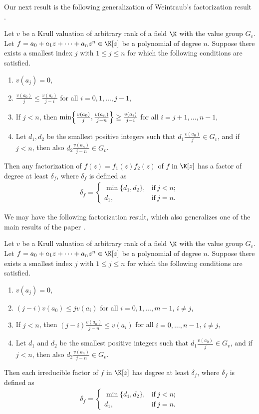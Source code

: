 \documentclass[12pt]{amsart}%
\begin{document}
Our next result is the following generalization of Weintraub's factorization result \cite{W}.
\begin{theorem}\label{th:2}
Let $v$ be a Krull valuation of arbitrary rank of a field $\K$ with  the value group $G_v$. Let $f=a_0+a_1 z+\cdots+a_nz^n \in \K[z]$ be a polynomial of degree $n$. Suppose there exists a smallest index $j$ with $1\leq j\leq n$ for which the following conditions are satisfied.
\begin{enumerate}[label=$(\roman*)$]
\item[$(i)$] $v(a_j)=0$,
\item[$(ii)$] $\frac{v(a_0)}{j}\leq \frac{v(a_i)}{j-i}$ for all $i=0,1,\ldots, j-1$,
\item[(iii)] If $j<n$, then $\min\Bigl\{\frac{v(a_0)}{j}, \frac{v(a_n)}{j-n}\Bigr\} \geq \frac{v(a_i)}{j-i}$ for all $i=j+1, \ldots, n-1$,
\item[$(iv)$] Let $d_1, d_2$ be the smallest positive integers such that $d_1\frac{v(a_0)}{j}\in G_v$, and if $j<n$, then also $d_2\frac{v(a_n)}{j-n}\in G_v$.
\end{enumerate}
Then any factorization of $f(z)=f_1(z)f_2(z)$ of $f$ in $\K[z]$ has a factor of degree at least $\delta_f$, where  $\delta_f$ is defined as
\begin{eqnarray*}
\delta_f=\begin{cases} \min\{d_1,d_2\}, & \text{if} ~ j < n; \\
d_1, & \text{if} ~ j=n.
\end{cases}
\end{eqnarray*}
\end{theorem}
We may have the following factorization result, which also generalizes one of the main results of the paper \cite[Theorem 3.7]{Kh23}.
\begin{theorem}\label{th:3}
Let $v$ be a Krull valuation of arbitrary rank of a field $\K$ with  the value group $G_v$. Let $f=a_0+a_1 z+\cdots+a_nz^n\in \K[z]$ be a polynomial of degree $n$. Suppose there exists a smallest index $j$ with $1\leq j\leq n$ for which the following conditions are satisfied.
\begin{enumerate}[label=$(\roman*)$]
\item[$(i)$] $v(a_j)=0$,
\item[$(ii)$] $(j-i)v(a_0)\leq jv(a_i)$ for all $i=0,1,\ldots, m-1$, $i\neq j$,
\item[(iii)] If $j<n$, then $(j-i)\frac{v(a_n)}{j-n} \leq v(a_i)$ for all $i=0, \ldots, n-1$, $i\neq j$,
\item[$(iv)$] Let $d_1$ and $d_2$ be the smallest positive integers such that $d_1\frac{v(a_0)}{j}\in G_v$, and if $j<n$, then also $d_2\frac{v(a_n)}{j-n}\in G_v$.
\end{enumerate}
Then each irreducible factor of $f$ in $\K[z]$ has degree at least $\delta_f$, where  $\delta_f$ is defined as
\begin{eqnarray*}
\delta_f=\begin{cases} \min\{d_1,d_2\}, & \text{if} ~ j < n; \\
d_1, & \text{if} ~ j=n.
\end{cases}
\end{eqnarray*}
\end{theorem}
\end{document}

